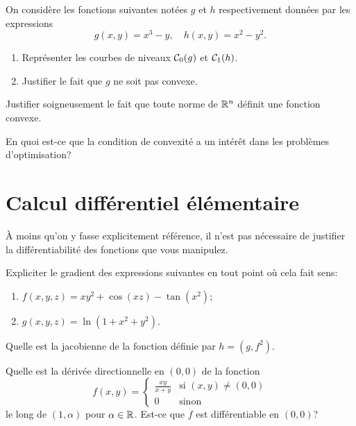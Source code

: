\documentclass[11pt, a4paper]{article}
\begin{document}
On considère les fonctions suivantes notées $g$ et $h$ respectivement
données par les expressions
\[
  g(x, y) = x^3- y, \quad h(x, y) = x^2-y^2.
\]
\begin{question}{2}
  \begin{enumerate}
  \item Représenter les courbes de niveaux
    $\mathcal{C}_0(g)$ et $\mathcal{C}_1(h)$.
  \item Justifier le fait que $g$ ne soit pas convexe.
  \end{enumerate}
\end{question}
\begin{question}{1}
  Justifier soigneusement le fait que toute norme de $\mathbb{R}^n$ définit
  une fonction convexe.
\end{question}
\begin{question}{1}
  En quoi est-ce que la condition de convexité a un intérêt dans les
  problèmes d'optimisation?
\end{question}

\section{Calcul différentiel élémentaire}

\noindent À moins qu'on y fasse explicitement référence, il n'est pas
nécessaire de justifier la différentiabilité des fonctions que vous
manipulez.
\begin{question}{2}
  Expliciter le gradient des expressions suivantes en tout point où
  cela fait sens:
  \begin{enumerate}
  \item $f(x, y, z) = xy^2 + \cos(xz) -\tan(x^2)$;
  \item $g(x, y, z) = \ln(1 + x^2 + y^2)$.
  \end{enumerate}
  Quelle est la jacobienne de la fonction définie par $h = (g, f^2)$.
\end{question}
\begin{question}{2}
  Quelle est la dérivée directionnelle en $(0, 0)$ de la fonction
  \[
    f(x, y) = \left\{
      \begin{array}{cc}
        \frac{xy}{x+ y} & \textrm{si $(x, y) \neq (0, 0)$} \\
        0 & \textrm{sinon}
      \end{array}\right.
  \]
  le long de $(1, \alpha)$ pour
  $\alpha \in \mathbb{R}$. Est-ce que $f$ est différentiable en $(0, 0)$?
\end{question}
\end{document}
